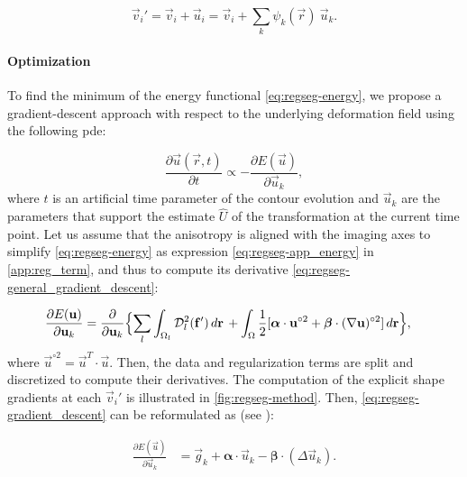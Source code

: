   \begin{equation}
  \vec{v}_i' = \vec{v}_i + \vec{u}_i = \vec{v}_i + \sum_k \psi_k(\vec{r}) \: \vec{u}_k.
  \label{eq:regseg-nodes_tfm}
  \end{equation}


\paragraph*{Optimization}
\label{sec:regseg-gradient_descent}
To find the minimum of the energy functional \eqref{eq:regseg-energy},
  we propose a gradient-descent approach with respect to the underlying
  deformation field using the following \gls*{pde}:

  \begin{equation}
  \frac{\partial \vec{u}(\vec{r},t)}{\partial t} \propto - \frac{\partial E(\vec{u})}{\partial \vec{u}_k},
  \label{eq:regseg-general_gradient_descent}
  \end{equation}
  where $t$ is an artificial time parameter of the contour
  evolution and $\vec{u}_k$ are the parameters that support the estimate
  $\hat{U}$ of the transformation at the current time point.
Let us assume that the anisotropy is aligned with the imaging axes to simplify
  \eqref{eq:regseg-energy} as expression \eqref{eq:regseg-app_energy} in \ref{app:reg_term},
  and thus to compute its derivative \eqref{eq:regseg-general_gradient_descent}:

  \begin{align}
  \frac{\partial E(\vec{u})}{\partial \vec{u}_k} &=
  \frac{ \partial }{\partial \vec{u}_k} \Big\{
  \underset{l}{\sum} \int_{\Omega_l} \mdist{f'}{l} \,d\vec{r} \, +   \int_{\Omega} \frac12 [ \boldsymbol{\alpha} \cdot \vec{u}^{\circ2}
  + \boldsymbol{\beta} \cdot (\nabla \vec{u})^{\circ2} ] \,d\vec{r}
  \Big\},
  \label{eq:regseg-gradient_descent}
  \end{align}
  where $\vec{u}^{\circ2} = \vec{u}^T \cdot \vec{u}$.
Then, the data and regularization terms are split and discretized to compute their
  derivatives.
The computation of the explicit shape gradients at each $\vec{v}_i'$ is illustrated in \autoref{fig:regseg-method}.
Then, \eqref{eq:regseg-gradient_descent} can be reformulated as (see ):

  \begin{align}
  \frac{\partial E(\vec{u})}{\partial \vec{u}_k} &=
  \vec{g}_k  + \boldsymbol{\alpha} \cdot \vec{u}_k - \boldsymbol{\beta} \cdot (\Delta \vec{u}_k).
  \label{eq:regseg-final_gradient}
  \end{align}

